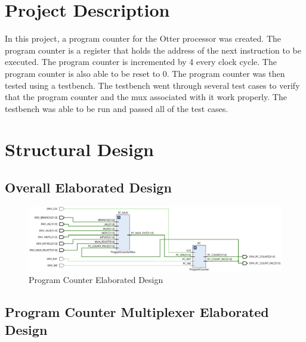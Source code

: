 \documentclass[
    a4paper, %
	12pt, %
    ]{CSSullivanBusinessReport}
\begin{document}
\begin{fullwidth} %

\section{Project Description} %

In this project, a program counter for the Otter processor was created. The program counter is a register that holds the address of the next instruction to be executed. The program counter is incremented by 4 every clock cycle. The program counter is also able to be reset to 0. The program counter was then tested using a testbench. The testbench went through several test cases to verify that the program counter and the mux associated with it work properly. The testbench was able to be run and passed all of the test cases.


\section{Structural Design} %

\subsection{Overall Elaborated Design} %

\begin{figure}[H]
    \centering
    \captionsetup{style=widetable}
    \includegraphics[width=.80\pdfpagewidth]{Figures/Program Counter Elaborated Design.png}
    \caption{Program Counter Elaborated Design}
    \label{fig:PCElaboratedDesign}
\end{figure}

\subsection{Program Counter Multiplexer Elaborated Design} %


\end{fullwidth}
\end{document}
